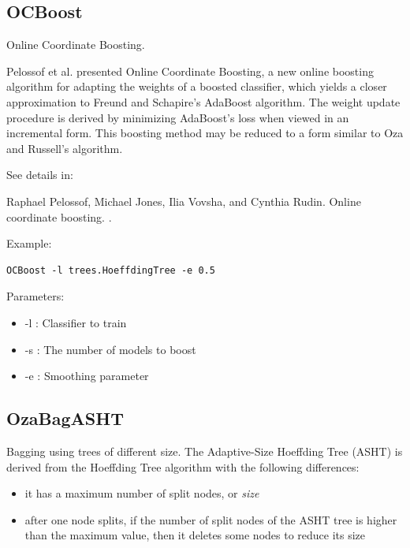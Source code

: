 \documentclass[a4paper,12pt,twoside]{book}
\begin{document}
\subsection{OCBoost} Online Coordinate Boosting.

Pelossof et al. presented  Online Coordinate Boosting, a new
online boosting algorithm for adapting the weights of a boosted classifier, which
yields a closer approximation to Freund and Schapire's AdaBoost algorithm.
The weight update procedure is derived by minimizing AdaBoost's loss when viewed in an incremental
form. This boosting method may be reduced to a form similar to Oza and Russell's algorithm.

See details in:

\begin{itemize}
Raphael Pelossof, Michael Jones, Ilia Vovsha, and Cynthia Rudin.
\newblock Online coordinate boosting.
.\end{itemize}

Example:
\begin{footnotesize}\begin{verbatim}
OCBoost -l trees.HoeffdingTree -e 0.5
\end{verbatim}\end{footnotesize}

Parameters:
\begin{itemize}
\item -l : Classifier to train
\item -s : The number of models to boost
\item -e : Smoothing parameter
\end{itemize}


\subsection{OzaBagASHT} Bagging using trees of different size.
The Adaptive-Size Hoeffding Tree (ASHT) is derived
from the Hoeffding Tree algorithm with the following differences:

\begin{itemize}
\item it has a maximum number of split nodes, or {\em size}
\item after one node splits, if the number of split nodes of the ASHT tree is higher than the
maximum value, then it deletes some nodes to reduce its size
\end{itemize}
\end{document}
